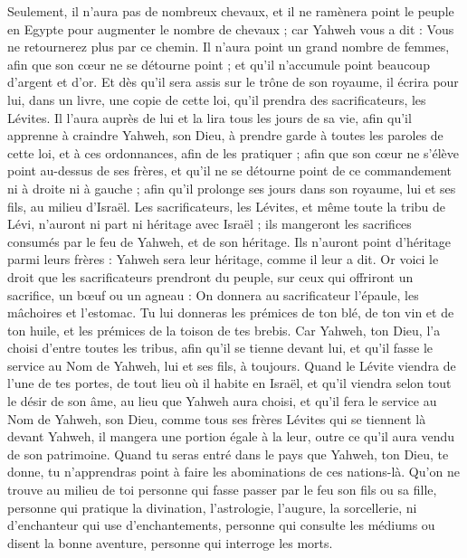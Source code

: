 \begin{multicols}{2}
Seulement, il n’aura pas de nombreux chevaux, et il ne ramènera point le peuple en Egypte pour augmenter le nombre de chevaux ; car Yahweh vous a dit : Vous ne retournerez plus par ce chemin.
Il n’aura point un grand nombre de femmes, afin que son cœur ne se détourne point ; et qu’il n’accumule point beaucoup d'argent et d’or.
Et dès qu'il sera assis sur le trône de son royaume, il écrira pour lui, dans un livre, une copie de cette loi, qu’il prendra des sacrificateurs, les Lévites.
Il l’aura auprès de lui et la lira tous les jours de sa vie, afin qu'il apprenne à craindre Yahweh, son Dieu, à prendre garde à toutes les paroles de cette loi, et à ces ordonnances, afin de les pratiquer ;
afin que son cœur ne s'élève point au-dessus de ses frères, et qu'il ne se détourne point de ce commandement ni à droite ni à gauche ; afin qu'il prolonge ses jours dans son royaume, lui et ses fils, au milieu d'Israël.
\VerseOne{}Les sacrificateurs, les Lévites, et même toute la tribu de Lévi, n'auront ni part ni héritage avec Israël ; ils mangeront les sacrifices consumés par le feu de Yahweh, et de son héritage.
Ils n'auront point d'héritage parmi leurs frères : Yahweh sera leur héritage, comme il leur a dit.
Or voici le droit que les sacrificateurs prendront du peuple, sur ceux qui offriront un sacrifice, un bœuf ou un agneau : On donnera au sacrificateur l'épaule, les mâchoires et l’estomac.
Tu lui donneras les prémices de ton blé, de ton vin et de ton huile, et les prémices de la toison de tes brebis.
Car Yahweh, ton Dieu, l’a choisi d'entre toutes les tribus, afin qu'il se tienne devant lui, et qu’il fasse le service au Nom de Yahweh, lui et ses fils, à toujours.
Quand le Lévite viendra de l’une de tes portes, de tout lieu où il habite en Israël, et qu'il viendra selon tout le désir de son âme, au lieu que Yahweh aura choisi,
et qu’il fera le service au Nom de Yahweh, son Dieu, comme tous ses frères Lévites qui se tiennent là devant Yahweh,
il mangera une portion égale à la leur, outre ce qu'il aura vendu de son patrimoine.
Quand tu seras entré dans le pays que Yahweh, ton Dieu, te donne, tu n'apprendras point à faire les abominations de ces nations-là.
Qu’on ne trouve au milieu de toi personne qui fasse passer par le feu son fils ou sa fille, personne qui pratique la divination, l’astrologie, l’augure, la sorcellerie,
ni d'enchanteur qui use d'enchantements, personne qui consulte les médiums ou disent la bonne aventure, personne qui interroge les morts.

\end{multicols}
